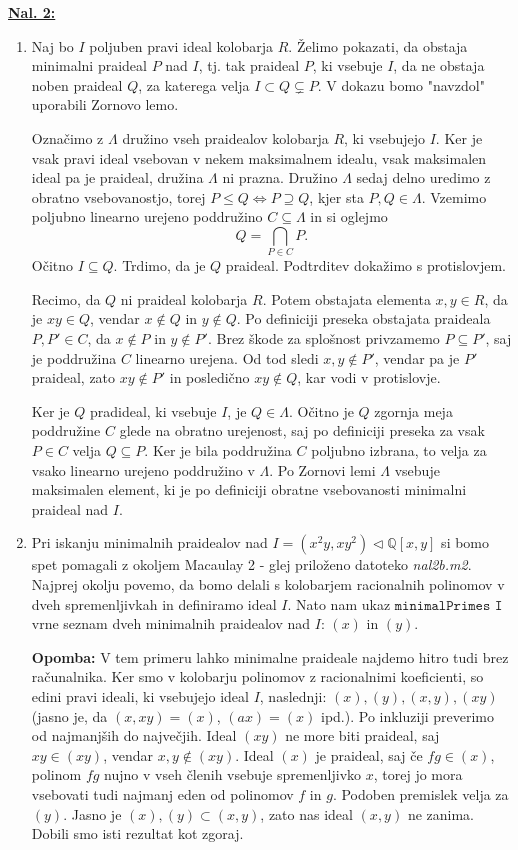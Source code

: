 \documentclass[a4paper, 12pt]{article} %
\newcommand{\Q}{\mathbb{Q}}
\newcommand{\subideal}{\vartriangleleft}
\begin{document}
\underline{\textbf{Nal. 2:}}
\begin{enumerate}[label=(\alph*)]
	\item Naj bo $I$ poljuben pravi ideal kolobarja $R$. Želimo pokazati, da obstaja minimalni praideal $P$ nad $I$, tj. tak praideal $P$, ki vsebuje $I$, da ne obstaja noben praideal $Q$, za katerega velja $I \subset Q \subsetneq P$. V dokazu bomo "navzdol" uporabili Zornovo lemo.
	
	Označimo z $\Lambda$ družino vseh praidealov kolobarja $R$, ki vsebujejo $I$. Ker je vsak pravi ideal vsebovan v nekem maksimalnem idealu, vsak maksimalen ideal pa je praideal, družina $\Lambda$ ni prazna. Družino $\Lambda$ sedaj delno uredimo z obratno vsebovanostjo, torej $P \leq Q \iff P \supseteq Q$, kjer sta $P,Q \in \Lambda$. Vzemimo poljubno linearno urejeno poddružino $C \subseteq \Lambda$ in si oglejmo
	\[
	Q = \bigcap_{P \in C}P.
	\]
	Očitno $I \subseteq Q$. Trdimo, da je $Q$ praideal. Podtrditev dokažimo s protislovjem.
	
	Recimo, da $Q$ ni praideal kolobarja $R$. Potem obstajata elementa $x, y \in R$, da je $xy \in Q$, vendar $x \notin Q$ in $y \notin Q$. Po definiciji preseka obstajata praideala $P,P' \in C$, da $x \notin P$ in $y \notin P'$. Brez škode za splošnost privzamemo $P \subseteq P'$, saj je poddružina $C$ linearno urejena. Od tod sledi $x,y \notin P'$, vendar pa je $P'$ praideal, zato $xy \notin P'$ in posledično $xy \notin Q$, kar vodi v protislovje.
	
	Ker je $Q$ pradideal, ki vsebuje $I$, je $Q \in \Lambda$. Očitno je $Q$ zgornja meja poddružine $C$ glede na obratno urejenost, saj po definiciji preseka za vsak $P \in C$ velja $Q \subseteq P$. Ker je bila poddružina $C$ poljubno izbrana, to velja za vsako linearno urejeno poddružino v $\Lambda$. Po Zornovi lemi $\Lambda$ vsebuje maksimalen element, ki je po definiciji obratne vsebovanosti minimalni praideal nad $I$.
	\item Pri iskanju minimalnih praidealov nad $I = (x^2y, xy^2) \subideal \Q[x,y]$ si bomo spet pomagali z okoljem Macaulay 2 - glej priloženo datoteko \textit{nal2b.m2}. Najprej okolju povemo, da bomo delali s kolobarjem racionalnih polinomov v dveh spremenljivkah in definiramo ideal $I$. Nato nam ukaz $\texttt{minimalPrimes I}$ vrne seznam dveh minimalnih praidealov nad $I$:  $(x) $ in $(y)$.
	
	\textbf{Opomba:} V tem primeru lahko minimalne praideale najdemo hitro tudi brez računalnika. Ker smo v kolobarju polinomov z racionalnimi koeficienti, so edini pravi ideali, ki vsebujejo ideal $I$, naslednji: $(x), (y), (x,y), (xy)$ (jasno je, da $(x,xy) = (x)$, $(ax) = (x)$ ipd.). Po inkluziji preverimo od najmanjših do največjih. Ideal $(xy)$ ne more biti praideal, saj $xy \in (xy)$, vendar $x,y \notin (xy)$. Ideal $(x)$ je praideal, saj če $fg \in (x)$, polinom $fg$ nujno v vseh členih vsebuje spremenljivko $x$, torej jo mora vsebovati tudi najmanj eden od polinomov $f$ in $g$. Podoben premislek velja za $(y)$. Jasno je $(x), (y) \subset (x,y)$, zato nas ideal $(x, y)$ ne zanima. Dobili smo isti rezultat kot zgoraj.
\end{enumerate}
\end{document}
